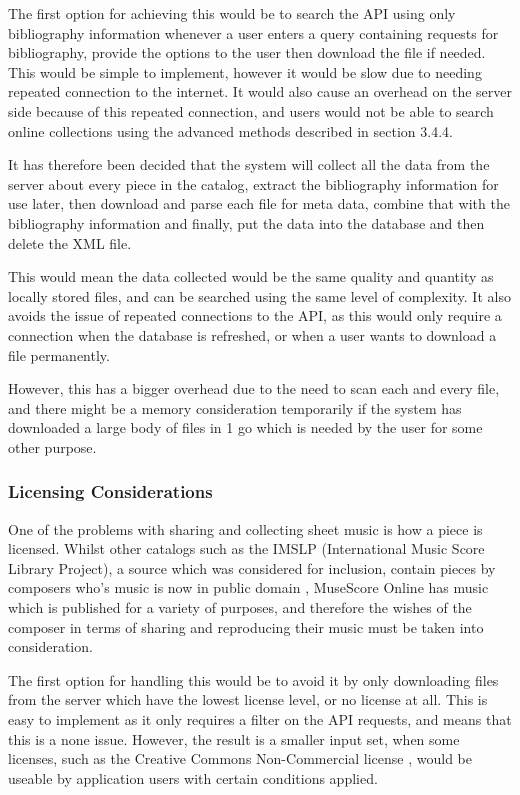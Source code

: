The first option for achieving this would be to search the API using only bibliography information whenever a user enters a query containing requests for bibliography, provide the options to the user then download the file if needed. This would be simple to implement, however it would be slow due to needing repeated connection to the internet. It would also cause an overhead on the server side because of this repeated connection, and users would not be able to search online collections using the advanced methods described in section 3.4.4. 

It has therefore been decided that the system will collect all the data from the server about every piece in the catalog, extract the bibliography information for use later, then download and parse each file for meta data, combine that with the bibliography information and finally, put the data into the database and then delete the XML file. 

This would mean the data collected would be the same quality and quantity as locally stored files, and can be searched using the same level of complexity. It also avoids the issue of repeated connections to the API, as this would only require a connection when the database is refreshed, or when a user wants to download a file permanently.

However, this has a bigger overhead due to the need to scan each and every file, and there might be a memory consideration temporarily if the system has downloaded a large body of files in 1 go which is needed by the user for some other purpose.

\subsubsection{Licensing Considerations}
One of the problems with sharing and collecting sheet music is how a piece is licensed. Whilst other catalogs such as the IMSLP (International Music Score Library Project), a source which was considered for inclusion, contain pieces by composers who's music is now in public domain \parencite{imslp}, MuseScore Online has music which is published for a variety of purposes, and therefore the wishes of the composer in terms of sharing and reproducing their music must be taken into consideration.

The first option for handling this would be to avoid it by only downloading files from the server which have the lowest license level, or no license at all. This is easy to implement as it only requires a filter on the API requests, and means that this is a none issue. However, the result is a smaller input set, when some licenses, such as the Creative Commons Non-Commercial license \parencite{cc-nc}, would be useable by application users with certain conditions applied.

